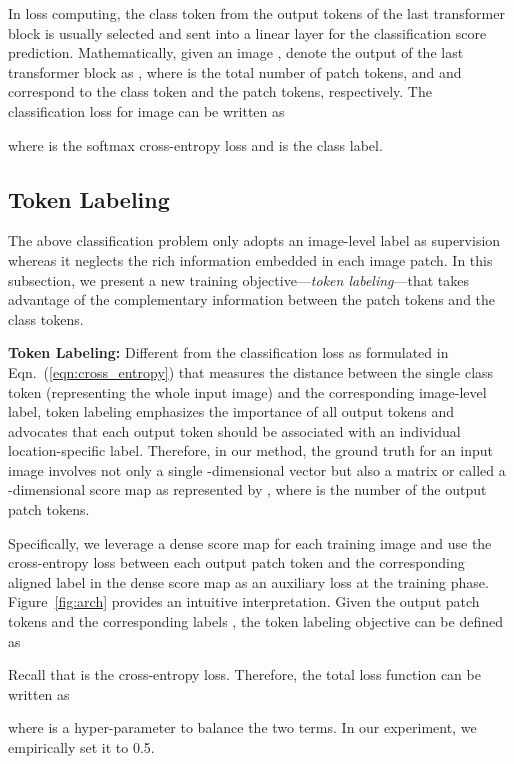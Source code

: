 \documentclass{article}
\newcommand{\myPara}[1]{\noindent\textbf{#1:}}
\begin{document}
In loss computing, the class token from the output tokens of the last transformer block is usually selected and sent into a linear layer for the classification score prediction.
Mathematically, given an image , denote the output of the last transformer block as ,
where  is the total number of patch tokens, and  and  correspond to the class token
and the patch tokens, respectively.
The classification loss for image  can be written as

where  is the softmax cross-entropy loss and  is the class label.




\subsection{Token Labeling} \label{sec:token_labeling}

The above classification problem only adopts an image-level label as supervision whereas it neglects the rich information embedded in each image patch.
In this subsection, we present a new training objective---\emph{token labeling}---that takes advantage of the complementary information between the patch tokens and the class tokens.

\myPara{Token Labeling} Different from the classification loss as formulated in Eqn.~(\ref{eqn:cross_entropy})
that measures the distance between the single class token (representing the whole input image) and the corresponding image-level label, 
token labeling emphasizes the importance of all output tokens and advocates that each output token should be associated with an individual location-specific label.
Therefore, in our method, the ground truth for an input image involves not only a single -dimensional vector
 but also a  matrix or called a -dimensional score map as represented by ,
where  is the number of the output patch tokens.


Specifically, we leverage a dense score map for each training image and 
use the cross-entropy loss between each output patch token and 
the corresponding aligned label in the dense score map as an auxiliary loss
at the training phase.
Figure~\ref{fig:arch} provides an intuitive interpretation.
Given the output patch tokens  and the corresponding labels ,
the token labeling objective can be defined as

Recall that  is the cross-entropy loss.
Therefore, the total loss function can be written as

where  is a hyper-parameter to balance the two terms.
In our experiment, we empirically set it to 0.5.
\end{document}
